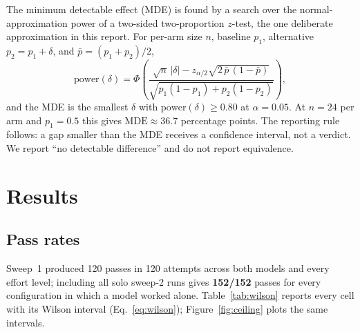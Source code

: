 \documentclass[11pt]{article}
\begin{document}
The minimum detectable effect (MDE) is found by a search over the
normal-approximation power of a two-sided two-proportion $z$-test, the one
deliberate approximation in this report. For per-arm size $n$, baseline
$p_1$, alternative $p_2 = p_1 + \delta$, and $\bar p = (p_1 + p_2)/2$,
%
\begin{equation}
\text{power}(\delta)
= \Phi\!\left(
\frac{\sqrt{n}\,\lvert\delta\rvert
      - z_{\alpha/2}\sqrt{2\,\bar p\,(1-\bar p)}}
     {\sqrt{p_1(1-p_1) + p_2(1-p_2)}}
\right),
\label{eq:power}
\end{equation}
%
and the MDE is the smallest $\delta$ with $\text{power}(\delta) \ge 0.80$ at
$\alpha = 0.05$. At $n = 24$ per arm and $p_1 = 0.5$ this gives
$\text{MDE} \approx 36.7$ percentage points. The reporting rule follows: a
gap smaller than the MDE receives a confidence interval, not a verdict. We
report ``no detectable difference'' and do not report equivalence.

\section{Results}

\subsection{Pass rates}

Sweep~1 produced 120 passes in 120 attempts across both models and every
effort level; including all solo sweep-2 runs gives \textbf{152/152} passes
for every configuration in which a model worked alone.
Table~\ref{tab:wilson} reports every cell with its Wilson interval
(Eq.~\ref{eq:wilson}); Figure~\ref{fig:ceiling} plots the same intervals.
\end{document}
